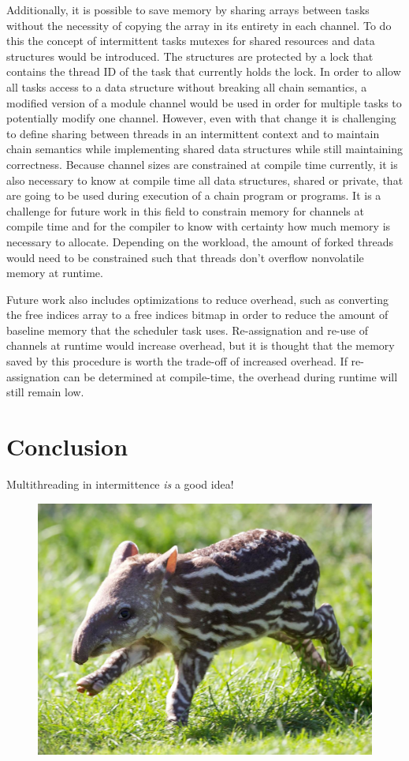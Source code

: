\documentclass[11pt]{sensys-proc}
\begin{document}
Additionally, it is possible to save memory by sharing arrays between tasks without the necessity of copying the array in its entirety in each channel.
To do this the concept of intermittent tasks mutexes for shared resources and data structures would be introduced.
The structures are protected by a lock that contains the thread ID of the task that currently holds the lock.
In order to allow all tasks access to a data structure without breaking all chain semantics, a modified version of a module channel would be used in order
for multiple tasks to potentially modify one channel.
However, even with that change it is challenging to define sharing between threads in an intermittent context and to maintain chain semantics while implementing
shared data structures while still maintaining correctness.
Because channel sizes are constrained at compile time currently, it is also necessary to know at compile time all data structures, shared or private,
that are going to be used during execution of a chain program or programs.
It is a challenge for future work in this field to constrain memory for channels at compile time and for the compiler to know with certainty how much memory
is necessary to allocate. Depending on the workload, the amount of forked threads would need to be constrained such that threads don't overflow nonvolatile memory at runtime.

Future work also includes optimizations to reduce overhead, such as converting the free indices array to a free indices bitmap in order to reduce the amount of
baseline memory that the scheduler task uses.
Re-assignation and re-use of channels at runtime would increase overhead, but it is thought that the memory saved by this procedure is worth the trade-off of increased overhead.
If re-assignation can be determined at compile-time, the overhead during runtime will still remain low.

\section{Conclusion}
Multithreading in intermittence {\em is} a good idea!

\begin{figure}[ht]
  \centering
  \includegraphics[width=0.9\columnwidth]{figs/tapir}
\end{figure}


\balance

\end{document}
